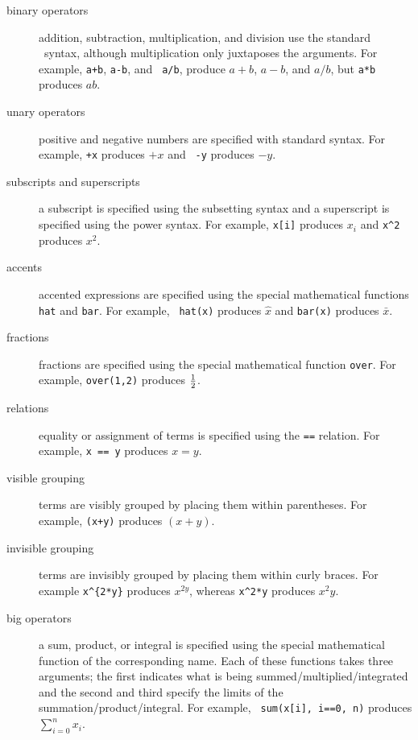 \begin{description}
\item[binary operators]  addition, subtraction, multiplication, and
division use the standard \R\ syntax, although multiplication only
juxtaposes the arguments.  For example, {\tt a+b}, {\tt a-b}, and {\tt
a/b}, produce $a+b$, $a-b$, and $a/b$, but {\tt a*b} produces $ab$.

\item[unary operators]  positive and negative numbers are specified
with standard syntax.  For example, {\tt +x} produces $+x$ and {\tt
-y} produces $-y$.

\item[subscripts and superscripts]  a subscript is specified
using the subsetting syntax and a superscript is specified using
the power syntax.  For example, {\tt x[i]} produces
$x_i$ and {\tt x\^{}2} produces $x^2$.

\item[accents] accented expressions are specified using the special
mathematical functions {\tt hat} and {\tt bar}.  For example, {\tt
hat(x)} produces $\hat x$ and {\tt bar(x)} produces $\bar x$.

\item[fractions] fractions are specified using the special
mathematical function {\tt over}. For example, {\tt over(1,2)}
produces $1\over2$.

\item[relations]  equality or assignment of terms is specified using
the {\tt ==} relation.  For example, {\tt x == y} produces $x=y$.

\item[visible grouping]  terms are visibly grouped by placing them
within parentheses.  For example, {\tt (x+y)} produces $(x+y)$.

\item[invisible grouping]  terms are invisibly grouped by placing
them within curly braces. For example {\tt x\^{}\{2*y\}} produces
$x^{2y}$, whereas {\tt x\^{}2*y} produces $x^2y$.

\item[big operators]  a sum, product, or integral is specified using
the special mathematical function of the corresponding name.  Each
of these functions takes three arguments;  the first indicates what
is being summed/multiplied/integrated and the second and third specify
the limits of the summation/product/integral.  For example, {\tt
sum(x[i], i==0, n)} produces $\sum\limits_{i=0}^n x_i$.


\end{description}
